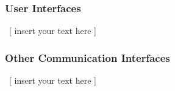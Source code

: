 \documentclass[twoside,letterpaper]{article}
\begin{document}
\subsubsection[User
Interfaces]{\rmfamily\bfseries\color{black}
User Interfaces}
{\color{black}
\foreignlanguage{english}{\ }\foreignlanguage{english}{[ insert your
text here ]}}

\subsubsection[Other Communication
Interfaces]{\rmfamily\bfseries\color{black}
Other Communication Interfaces}
{\color{black}
\foreignlanguage{english}{\ }\foreignlanguage{english}{[ insert your
text here ]}}


\bigskip


\bigskip

\bigskip
\clearpage\setcounter{page}{1}\pagestyle{Convertiv}

\bigskip
\end{document}
